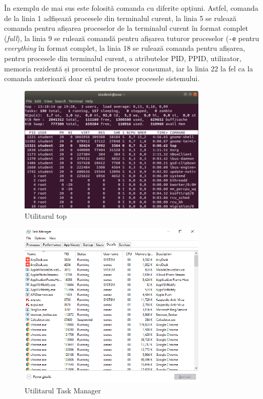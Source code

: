 În exemplu de mai sus este folosită comanda  cu diferite opțiuni. Astfel, comanda de la linia 1 adfișează procesele din terminalul curent, la linia 5 se rulează comanda pentru afișarea proceselor de la terminalul curent în format complet (\textit{full}), la linia 9 se rulează comandă pentru afișarea tuturor proceselor (\texttt{-e} pentru \textit{everything} în format complet, la linia 18 se rulează comanda pentru afișarea, pentru procesele din terminalul curent, a atributelor PID, PPID, utilizator, memoria rezidentă și procentul de procesor consumat, iar la linia 22 la fel ca la comanda anterioară doar că pentru toate procesele sistemului.

\begin{figure}[!htbp]
	\centering
	\includegraphics[width=0.8\textwidth]{chapters/04-process/img/top.png}
	\caption{Utilitarul top}
	\label{fig:process-top}
\end{figure}

\begin{figure}[!htbp]
	\centering
	\includegraphics[width=0.8\textwidth]{chapters/04-process/img/task-manager.png}
	\caption{Utilitarul Task Manager}
	\label{fig:process-task-manager}
\end{figure}

